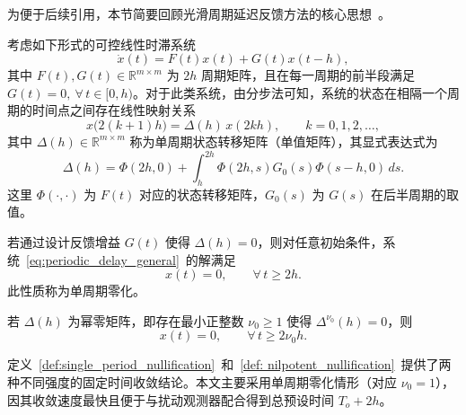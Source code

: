 为便于后续引用，本节简要回顾光滑周期延迟反馈方法的核心思想~\cite{zhouFixedtimeStabilizationLinear2022}。

考虑如下形式的可控线性时滞系统
\begin{equation}
\dot x(t) = F(t)x(t) + G(t)x(t-h),
\label{eq:periodic_delay_general}
\end{equation}
其中 \(F(t),G(t)\in\mathbb R^{m\times m}\) 为 \(2h\) 周期矩阵，且在每一周期的前半段满足 \(G(t)=0,\ \forall\,t\in[0,h)\)。对于此类系统，由分步法可知，系统的状态在相隔一个周期的时间点之间存在线性映射关系
\begin{equation}
x\bigl(2(k+1)h\bigr) = \Delta(h)\,x(2kh),\qquad k=0,1,2,\ldots,
\label{eq:period_map_abstract}
\end{equation}
其中 \(\Delta(h)\in\mathbb R^{m\times m}\) 称为单周期状态转移矩阵（单值矩阵），其显式表达式为
\begin{equation}
\Delta(h) = \Phi(2h,0) + \int_h^{2h} \Phi(2h,s) G_0(s) \Phi(s-h,0)\,ds.
\label{eq:period_map_explicit}
\end{equation}
这里 \(\Phi(\cdot,\cdot)\) 为 \(F(t)\) 对应的状态转移矩阵，\(G_0(s)\) 为 \(G(s)\) 在后半周期的取值。

\begin{definition}[单周期零化]\label{def:single_period_nullification}
  若通过设计反馈增益 \(G(t)\) 使得 \(\Delta(h)=0\)，则对任意初始条件，系统~\eqref{eq:periodic_delay_general}~的解满足
  \[
  x(t)=0,\qquad \forall\,t\ge 2h.
  \]
  此性质称为单周期零化。
\end{definition}

\begin{definition}[幂零零化]\label{def: nilpotent_nullification}
  若 \(\Delta(h)\) 为幂零矩阵，即存在最小正整数 \(\nu_0\ge 1\) 使得 \(\Delta^{\nu_0}(h)=0\)，则
  \[
  x(t)=0,\qquad \forall\,t\ge 2\nu_0 h.
  \]
\end{definition}

定义~\ref{def:single_period_nullification}~和~\ref{def: nilpotent_nullification}~提供了两种不同强度的固定时间收敛结论。本文主要采用单周期零化情形（对应 \(\nu_0=1\)），因其收敛速度最快且便于与扰动观测器配合得到总预设时间 \(T_o+2h\)。